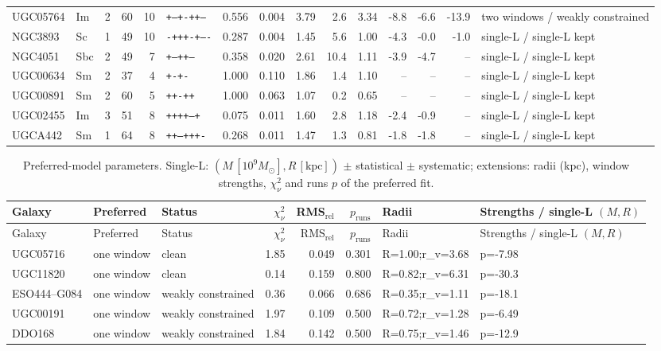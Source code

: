 \documentclass[10pt]{article}
\begin{document}
\begin{landscape}
{\begin{longtable}{lllrrlrrrrrrrrl}
UGC05764 & Im & 2 & 60 & 10 & \texttt{+--+-++---} & 0.556 & 0.004 & 3.79 & 2.6 & 3.34 & -8.8 & -6.6 & -13.9 & two windows / weakly constrained\\
NGC3893 & Sc & 1 & 49 & 10 & \texttt{-+++-+----} & 0.287 & 0.004 & 1.45 & 5.6 & 1.00 & -4.3 & -0.0 & -1.0 & single-L / single-L kept\\
NGC4051 & Sbc & 2 & 49 & 7 & \texttt{+--++--} & 0.358 & 0.020 & 2.61 & 10.4 & 1.11 & -3.9 & -4.7 & -- & single-L / single-L kept\\
UGC00634 & Sm & 2 & 37 & 4 & \texttt{+-+-} & 1.000 & 0.110 & 1.86 & 1.4 & 1.10 & -- & -- & -- & single-L / single-L kept\\
UGC00891 & Sm & 2 & 60 & 5 & \texttt{++-++} & 1.000 & 0.063 & 1.07 & 0.2 & 0.65 & -- & -- & -- & single-L / single-L kept\\
UGC02455 & Im & 3 & 51 & 8 & \texttt{++++---+} & 0.075 & 0.011 & 1.60 & 2.8 & 1.18 & -2.4 & -0.9 & -- & single-L / single-L kept\\
UGCA442 & Sm & 1 & 64 & 8 & \texttt{++--+++-} & 0.268 & 0.011 & 1.47 & 1.3 & 0.81 & -1.8 & -1.8 & -- & single-L / single-L kept\\
\end{longtable}
\begin{longtable}{lllrrrll}
\caption{Preferred-model parameters. Single-L: $(M\,[10^9M_\odot],R\,[\mathrm{kpc}])$ $\pm$ statistical $\pm$ systematic; extensions: radii (kpc), window strengths, $\chi^2_\nu$ and runs $p$ of the preferred fit.}\\\toprule
Galaxy & Preferred & Status & $\chi^2_\nu$ & RMS$_\mathrm{rel}$ & $p_\mathrm{runs}$ & Radii & Strengths / single-L $(M,R)$\\\midrule\endfirsthead
\toprule Galaxy & Preferred & Status & $\chi^2_\nu$ & RMS$_\mathrm{rel}$ & $p_\mathrm{runs}$ & Radii & Strengths / single-L $(M,R)$\\\midrule\endhead\bottomrule\endfoot
UGC05716 & one window & clean & 1.85 & 0.049 & 0.301 & R=1.00;r\_v=3.68 & p=-7.98\\
UGC11820 & one window & clean & 0.14 & 0.159 & 0.800 & R=0.82;r\_v=6.31 & p=-30.3\\
ESO444--G084 & one window & weakly constrained & 0.36 & 0.066 & 0.686 & R=0.35;r\_v=1.11 & p=-18.1\\
UGC00191 & one window & weakly constrained & 1.97 & 0.109 & 0.500 & R=0.72;r\_v=1.28 & p=-6.49\\
DDO168 & one window & weakly constrained & 1.84 & 0.142 & 0.500 & R=0.75;r\_v=1.46 & p=-12.9\\

\end{longtable}}
\end{landscape}
\end{document}
